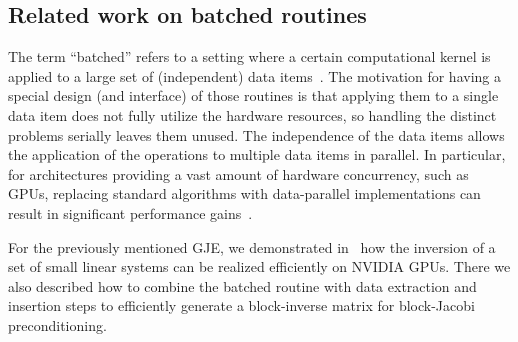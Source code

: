 \subsection{Related work on batched routines}
The term ``batched'' refers to a setting where a certain computational kernel is applied
to a large set of (independent) data items~\cite{ANU:10332060}. 
The motivation for having a special design (and interface) of those routines is that applying
them to a single data item does not fully utilize the hardware
resources, so handling the distinct problems serially leaves them unused.
The independence of the data items allows the application
of the operations to multiple data items in parallel.
In particular, for architectures providing a vast amount of hardware concurrency, such as GPUs,
replacing standard algorithms with data-parallel implementations can result in significant
performance gains~\cite{Abdelfattah2016119}. 

For the previously mentioned GJE, we demonstrated in~\cite{gje} how
the inversion of a set of small linear systems can be realized efficiently
on NVIDIA GPUs. There we also described how to combine the 
batched routine with data extraction and insertion steps to efficiently generate
a block-inverse matrix for block-Jacobi preconditioning.
